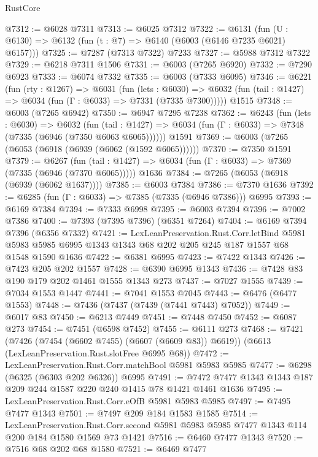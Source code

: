 \begin{lexlean}{RustCore}
\begin{coremodule}
@7312 := @6028 @7311
@7313 := @6025 @7312
@7322 := @6131 (fun (U : @6130) => @6132 (fun (t : @7) => @6140 (@6003 (@6146 @7235 @6021) @6157)))
@7325 := @7287 (@7313 @7322) @7233
@7327 := @5988 @7312 @7322
@7329 := @6218 @7311 @1506
@7331 := @6003 (@7265 @6920)
@7332 := @7290 @6923
@7333 := @6074 @7332
@7335 := @6003 (@7333 @6095)
@7346 := @6221
    (fun (rty : @1267) =>
    @6031
      (fun (lets : @6030) =>
      @6032 (fun (tail : @1427) => @6034 (fun (Γ : @6033) => @7331 (@7335 @7300)))))
    @1515
@7348 := @6003 (@7265 @6942)
@7350 := @6947 @7295 @7238
@7362 := @6243
    (fun (lets : @6030) =>
    @6032
      (fun (tail : @1427) => @6034 (fun (Γ : @6033) => @7348 (@7335 (@6946 (@7350 @6063 @6065))))))
    @1591
@7369 := @6003 (@7265 (@6053 (@6918 (@6939 (@6062 (@1592 @6065))))))
@7370 := @7350 @1591
@7379 := @6267
    (fun (tail : @1427) => @6034 (fun (Γ : @6033) => @7369 (@7335 (@6946 (@7370 @6065)))))
    @1636
@7384 := @7265 (@6053 (@6918 (@6939 (@6062 @1637))))
@7385 := @6003 @7384
@7386 := @7370 @1636
@7392 := @6285 (fun (Γ : @6033) => @7385 (@7335 (@6946 @7386))) @6995
@7393 := @6169 @7384
@7394 := @7333 @6998
@7395 := @6003 @7394
@7396 := @7002 @7386
@7400 := @7393 (@7395 @7396) (@6351 @7264)
@7404 := @6169 @7394 @7396 (@6356 @7332)
@7421 := LexLeanPreservation.Rust.Corr.letBind
    @5981
    @5983
    @5985
    @6995
    @1343
    @1343
    @68
    @202
    @205
    @245
    @187
    @1557
    @68
    @1548
    @1590
    @1636
@7422 := @6381 @6995
@7423 := @7422 @1343
@7426 := @7423 @205 @202 @1557
@7428 := @6390 @6995 @1343
@7436 := @7428 @83 @190 @179 @202 @1461 @1555 @1343 @273
@7437 := @7027 @1555
@7439 := @7034 @1553 @1447
@7441 := @7041 @1553 @7045
@7443 := @6476 (@6477 @1553)
@7448 := @7436 (@7437 (@7439 (@7441 @7443) @7052))
@7449 := @6017 @83
@7450 := @6213 @7449
@7451 := @7448 @7450
@7452 := @6087 @273
@7454 := @7451 (@6598 @7452)
@7455 := @6111 @273
@7468 := @7421
    (@7426 (@7454 (@6602 @7455) (@6607 (@6609 @83)) @6619))
    (@6613 (LexLeanPreservation.Rust.slotFree @6995 @68))
@7472 := LexLeanPreservation.Rust.Corr.matchBool @5981 @5983 @5985
@7477 := @6298 (@6325 (@6303 @202 @6326)) @6995
@7491 := @7472 @7477 @1343 @1343 @187 @209 @244 @1587 @220 @240 @1415 @78 @1421 @1461 @1636
@7495 := LexLeanPreservation.Rust.Corr.eOfB @5981 @5983 @5985
@7497 := @7495 @7477 @1343
@7501 := @7497 @209 @184 @1583 @1585
@7514 := LexLeanPreservation.Rust.Corr.second
    @5981
    @5983
    @5985
    @7477
    @1343
    @114
    @200
    @184
    @1580
    @1569
    @73
    @1421
@7516 := @6460 @7477 @1343
@7520 := @7516 @68 @202 @68 @1580
@7521 := @6469 @7477

\end{coremodule}
\end{lexlean}
